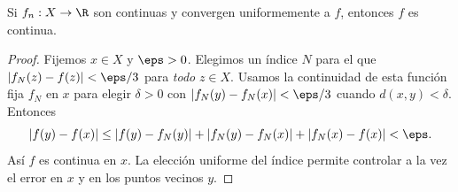 \begin{teorema}\label{ch12:limite-continuo}
Si $f_n:X\to\R$ son continuas y convergen uniformemente a $f$, entonces $f$ es continua.
\end{teorema}
\begin{proof}
Fijemos $x\in X$ y $\eps>0$. Elegimos un índice $N$ para el que $|f_N(z)-f(z)|<\eps/3$ para \emph{todo} $z\in X$. Usamos la continuidad de esta función fija $f_N$ en $x$ para elegir $\delta>0$ con $|f_N(y)-f_N(x)|<\eps/3$ cuando $d(x,y)<\delta$. Entonces
\[
 |f(y)-f(x)|\leq |f(y)-f_N(y)|+|f_N(y)-f_N(x)|+|f_N(x)-f(x)|<\eps.
\]
Así $f$ es continua en $x$. La elección uniforme del índice permite controlar a la vez el error en $x$ y en los puntos vecinos $y$.
\end{proof}

